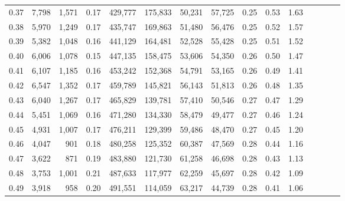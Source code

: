 \begin{tabular}{rrrcrrrrrrrrrrr}
0.37 &   7,798 &   1,571 &                                       0.17 &  429,777 &  175,833 &   50,231 &   57,725 &  0.25 &  0.53 &                         1.63 \\
0.38 &   5,970 &   1,249 &                                       0.17 &  435,747 &  169,863 &   51,480 &   56,476 &  0.25 &  0.52 &                         1.57 \\
0.39 &   5,382 &   1,048 &                                       0.16 &  441,129 &  164,481 &   52,528 &   55,428 &  0.25 &  0.51 &                         1.52 \\
0.40 &   6,006 &   1,078 &                                       0.15 &  447,135 &  158,475 &   53,606 &   54,350 &  0.26 &  0.50 &                         1.47 \\
0.41 &   6,107 &   1,185 &                                       0.16 &  453,242 &  152,368 &   54,791 &   53,165 &  0.26 &  0.49 &                         1.41 \\
0.42 &   6,547 &   1,352 &                                       0.17 &  459,789 &  145,821 &   56,143 &   51,813 &  0.26 &  0.48 &                         1.35 \\
0.43 &   6,040 &   1,267 &                                       0.17 &  465,829 &  139,781 &   57,410 &   50,546 &  0.27 &  0.47 &                         1.29 \\
0.44 &   5,451 &   1,069 &                                       0.16 &  471,280 &  134,330 &   58,479 &   49,477 &  0.27 &  0.46 &                         1.24 \\
0.45 &   4,931 &   1,007 &                                       0.17 &  476,211 &  129,399 &   59,486 &   48,470 &  0.27 &  0.45 &                         1.20 \\
0.46 &   4,047 &     901 &                                       0.18 &  480,258 &  125,352 &   60,387 &   47,569 &  0.28 &  0.44 &                         1.16 \\
0.47 &   3,622 &     871 &                                       0.19 &  483,880 &  121,730 &   61,258 &   46,698 &  0.28 &  0.43 &                         1.13 \\
0.48 &   3,753 &   1,001 &                                       0.21 &  487,633 &  117,977 &   62,259 &   45,697 &  0.28 &  0.42 &                         1.09 \\
0.49 &   3,918 &     958 &                                       0.20 &  491,551 &  114,059 &   63,217 &   44,739 &  0.28 &  0.41 &                         1.06 \\

\end{tabular}
